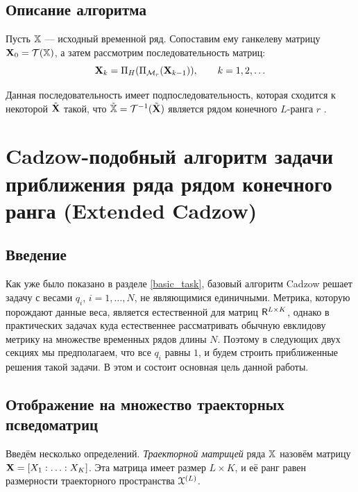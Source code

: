 \documentclass[12pt,a4paper,fleqn,leqno]{article}
\begin{document}
\subsection{Описание алгоритма}
Пусть $\mathbb{X}$ --- исходный временной ряд. Сопоставим ему ганкелеву матрицу $\mathbf{X}_0 = \mathcal{T}(\mathbb{X})$, а затем рассмотрим последовательность матриц:
\begin{equation*}
\mathbf{X}_k = \Pi_H (\Pi_{\mathcal{M}_r} (\mathbf{X}_{k-1})), \qquad k = 1, 2, \ldots
\end{equation*}

Данная последовательность имеет подпоследовательность, которая сходится к некоторой $\tilde{\mathbf{X}}$ такой, что $\tilde{\mathbb{X}} = \mathcal{T}^{-1}(\tilde{\mathbf{X}})$ является рядом конечного $L$-ранга $r$ \cite{Cadzow1988}.

\section{Cadzow-подобный алгоритм задачи приближения ряда рядом конечного ранга (Extended Cadzow)}
\subsection{Введение}
Как уже было показано в разделе \ref{basic_task}, базовый алгоритм Cadzow решает задачу с весами $q_i$, $i = 1, \ldots, N$, не являющимися единичными. Метрика, которую порождают данные веса, является естественной для матриц $\mathsf{R}^{L \times K}$, однако в практических задачах куда естественнее рассматривать обычную евклидову метрику на множестве временных рядов длины $N$. Поэтому в следующих двух секциях мы предполагаем, что все $q_i$ равны $1$, и будем строить приближенные решения такой задачи. В этом и состоит основная цель данной работы.

\subsection{Отображение на множество траекторных псведоматриц}
Введём несколько определений. \emph{Траекторной матрицей} ряда $\mathbb{X}$ назовём матрицу $\mathbf{X} = [X_1 : \ldots : X_K]$. Эта матрица имеет размер $L \times K$, и её ранг равен размерности траекторного пространства $\EuScript{X}^{(L)}$.
\end{document}
